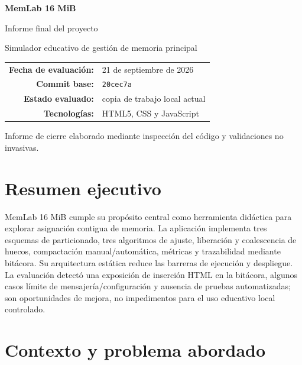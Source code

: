 \documentclass[11pt,a4paper]{article}
\begin{document}
\begin{titlepage}
  \centering
  \vspace*{2.0cm}
  {\sffamily\bfseries\fontsize{34}{39}\selectfont\color{MemBlue} MemLab 16 MiB\par}
  \vspace{0.5cm}
  {\sffamily\fontsize{23}{28}\selectfont Informe final del proyecto\par}
  \vspace{0.8cm}
  {\Large Simulador educativo de gestión de memoria principal\par}
  \vfill
  \begin{tabular}{rl}
    \textbf{Fecha de evaluación:} & 21 de septiembre de 2026\\
    \textbf{Commit base:} & \texttt{20cec7a}\\
    \textbf{Estado evaluado:} & copia de trabajo local actual\\
    \textbf{Tecnologías:} & HTML5, CSS y JavaScript\\
  \end{tabular}
  \vfill
  {\small Informe de cierre elaborado mediante inspección del código y validaciones no invasivas.\par}
\end{titlepage}

\tableofcontents
\newpage

\section{Resumen ejecutivo}

\begin{ejecutivo}
MemLab 16 MiB cumple su propósito central como herramienta didáctica para explorar
asignación contigua de memoria. La aplicación implementa tres esquemas de
particionado, tres algoritmos de ajuste, liberación y coalescencia de huecos,
compactación manual/automática, métricas y trazabilidad mediante bitácora. Su
arquitectura estática reduce las barreras de ejecución y despliegue. La evaluación
detectó una exposición de inserción HTML en la bitácora, algunos casos límite de
mensajería/configuración y ausencia de pruebas automatizadas; son oportunidades de
mejora, no impedimentos para el uso educativo local controlado.
\end{ejecutivo}

\section{Contexto y problema abordado}
\end{document}
